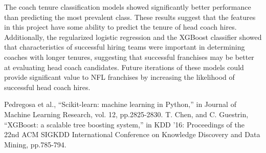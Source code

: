 \documentclass[conference]{IEEEtran}
\begin{document}
The coach tenure classification models showed significantly better performance than predicting the most prevalent class. These results suggest that the features in this project have some ability to predict the tenure of head coach hires. Additionally, the regularized logistic regression and the XGBoost classifier showed that characteristics of successful hiring teams were important in determining coaches with longer tenures, suggesting that successful franchises may be better at evaluating head coach candidates. Future iterations of these models could provide significant value to NFL franchises by increasing the likelihood of successful head coach hires.

\begin{thebibliography}{00}
 Pedregosa et al., ``Scikit-learn: machine learning in Python,'' in Journal of Machine Learning Research, vol. 12, pp.2825-2830.
 T. Chen, and C. Guestrin, ``XGBoost: a scalable tree boosting system,'' in KDD '16: Proceedings of the 22nd ACM SIGKDD International Conference on Knowledge Discovery and Data Mining, pp.785-794.
\end{thebibliography}
\end{document}
